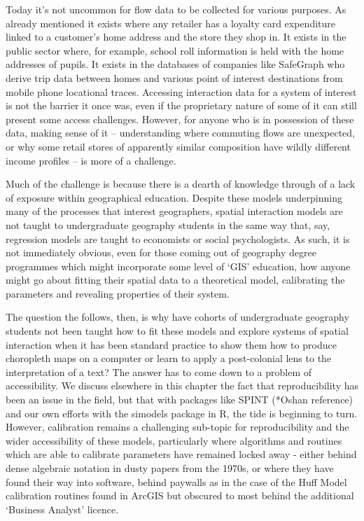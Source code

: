 \documentclass[11pt,letterpaper]{article}
\begin{document}
Today it's not uncommon for flow data to be collected for
various purposes.
As already mentioned it exists where any retailer has a
loyalty card expenditure linked to a customer's home address and the store they
shop in.
It exists in the public sector where, for example, school roll
information is held with the home addresses of pupils.
It exists in the
databases of companies like SafeGraph who derive trip data between homes and various
point of interest destinations from mobile phone locational traces.
Accessing interaction
data for a system of interest is not the barrier it once was, even if the
proprietary nature of some of it can still present some access challenges.
However,
for anyone who is in possession of these data, making sense of it --
understanding where commuting flows are unexpected, or why some retail stores
of apparently similar composition have wildly different income profiles -- is
more of a challenge.

Much of the challenge is because there is a dearth of
knowledge through of a lack of exposure within geographical education.
Despite
these models underpinning many of the processes that interest geographers,
spatial interaction models are not taught to undergraduate geography students
in the same way that, say, regression models are taught to economists or social
psychologists.
As such, it is not immediately obvious, even for those coming
out of geography degree programmes which might incorporate some level of `GIS'
education, how anyone might go about fitting their spatial data to a theoretical
model, calibrating the parameters and revealing properties of their system.

The question the follows, then, is why have cohorts of
undergraduate geography students not been taught how to fit these models and
explore systems of spatial interaction when it has been standard practice to
show them how to produce choropleth maps on a computer or learn to apply a post-colonial
lens to the interpretation of a text?
The answer has to come down to a problem
of accessibility.
We discuss elsewhere in this chapter the fact that
reproducibility has been an issue in the field, but that with packages like
SPINT (*Oshan reference) and our own efforts with the simodels package in R,
the tide is beginning to turn.
However, calibration remains a challenging
sub-topic for reproducibility and the wider accessibility of these models,
particularly where algorithms and routines which are able to calibrate parameters
have remained locked away - either behind dense algebraic notation in dusty
papers from the 1970s, or where they have found their way into software, behind
paywalls as in the case of the Huff Model calibration routines found in ArcGIS but
obscured to most behind the additional `Business Analyst' licence.
\end{document}
